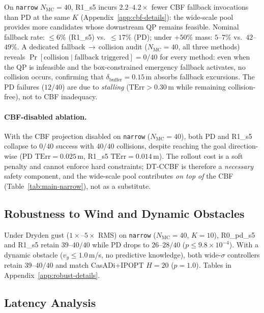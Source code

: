 \documentclass[11pt,onecolumn,a4paper]{article}
\newcommand{\Nm}{N_{\mathrm{MC}}}
\newcommand{\TErr}{\mathrm{TErr}}
\begin{document}
On \texttt{narrow} $\Nm = 40$, R1\_s5 incurs $2.2$--$4.2\times$
fewer CBF fallback invocations than PD at the same $K$
(Appendix~\ref{app:cbf-details}): the wide-scale pool provides more
candidates whose downstream QP remains feasible. Nominal fallback rate:
$\le 6\%$ (R1\_s5) vs.\ $\le 17\%$ (PD); under $+50\%$ mass:
$5$--$7\%$ vs.\ $42$--$49\%$.
A dedicated fallback$\,\to\,$collision audit ($\Nm = 40$, all three methods)
reveals $\Pr[\text{collision} \mid \text{fallback triggered}] = 0/40$ for
every method: even when the QP is infeasible and the box-constrained
emergency fallback activates, no collision occurs, confirming that
$\delta_{\mathrm{buffer}} = 0.15\,$m absorbs fallback excursions.
The PD failures ($12/40$) are due to \emph{stalling}
($\TErr > 0.30\,$m while remaining collision-free), not to CBF
inadequacy.

\paragraph{CBF-disabled ablation.}\label{sec:exp-nocbf}
With the CBF projection disabled on \texttt{narrow} ($\Nm = 40$), both
PD and R1\_s5 collapse to $0/40$ success with $40/40$ collisions, despite
reaching the goal direction-wise (PD $\TErr = 0.025\,$m, R1\_s5
$\TErr = 0.014\,$m). The rollout cost is a soft penalty and cannot
enforce hard constraints; DT-CCBF is therefore a \emph{necessary}
safety component, and the wide-scale pool contributes \emph{on top of}
the CBF (Table~\ref{tab:main-narrow}), not as a substitute.

\subsection{Robustness to Wind and Dynamic Obstacles}\label{sec:exp-robust}

Under Dryden gust ($1\times$--$5\times$ RMS) on \texttt{narrow}
($\Nm = 40$, $K = 10$), R0\_pd\_s5 and R1\_s5 retain $39$--$40/40$
while PD drops to $26$--$28/40$ ($p \le 9.8\times 10^{-4}$). With a
dynamic obstacle ($v_y \le 1.0\,$m/s, no predictive knowledge), both
wide-$\sigma$ controllers retain $39$--$40/40$ and match
CasADi+IPOPT $H = 20$ ($p = 1.0$).
Tables in Appendix~\ref{app:robust-details}.

\subsection{Latency Analysis}\label{sec:exp-latency}
\end{document}
